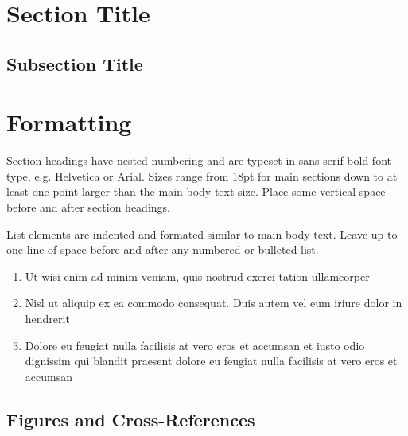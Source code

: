 \documentclass[11pt, a4paper,oneside,chapterprefix=false]{scrbook}
\begin{document}
\section{Section Title} \label{sec:one}

\subsection{Subsection Title}


\section{Formatting} \label{sec:format}

Section headings have nested numbering and are typeset in sans-serif bold font type, e.g. Helvetica or Arial.  Sizes range from 18pt for main sections down to at least one point larger than the main body text size. Place some vertical space before and after section headings.

List elements are indented and formated similar to main body text. Leave up to one line of space before and after any numbered or bulleted list.

\begin{enumerate}
\item Ut wisi enim ad minim veniam, quis nostrud exerci tation ullamcorper 
\item Nisl ut aliquip ex ea commodo consequat. Duis autem vel eum iriure dolor in hendrerit
\item Dolore eu feugiat nulla facilisis at vero eros et accumsan et iusto odio dignissim qui blandit praesent dolore eu feugiat nulla facilisis at vero eros et accumsan
\end{enumerate}

\subsection{Figures and Cross-References}
\end{document}
